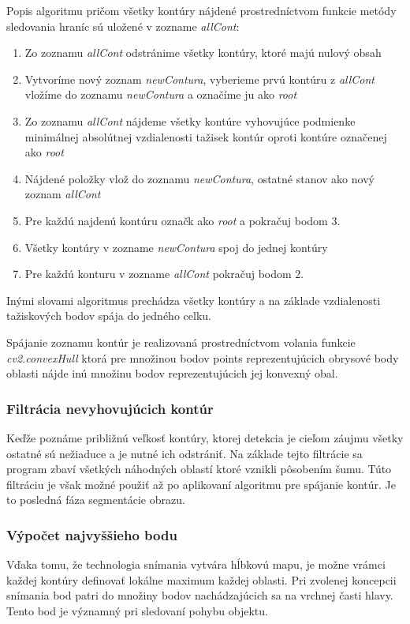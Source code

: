 Popis algoritmu pričom všetky kontúry nájdené prostredníctvom funkcie metódy sledovania hraníc sú uložené v zozname \textit{allCont}:
\begin{enumerate}
  \item Zo zoznamu \textit{allCont} odstránime všetky kontúry, ktoré majú nulový obsah
  \item Vytvoríme nový zoznam \textit{newContura}, vyberieme prvú kontúru z \textit{allCont} vložíme do zoznamu \textit{newContura} a označíme ju ako \textit{root}
  \item Zo zoznamu \textit{allCont} nájdeme všetky kontúre vyhovujúce podmienke minimálnej absolútnej vzdialenosti tažisek kontúr oproti kontúre označenej ako \textit{root}  
  \item Nájdené položky vlož do zoznamu \textit{newContura}, ostatné stanov ako nový zoznam \textit{allCont}
  \item Pre každú najdenú kontúru označk ako \textit{root} a  pokračuj bodom 3.
  \item Všetky kontúry v zozname \textit{newContura} spoj do jednej kontúry
  \item Pre každú konturu v zozname \textit{allCont} pokračuj bodom 2.
  
\end{enumerate}
Inými slovami algoritmus prechádza všetky kontúry a na základe vzdialenosti tažiskových bodov spája do jedného celku.


Spájanie zoznamu kontúr je realizovaná prostredníctvom volania funkcie  \textit{cv2.convexHull} ktorá pre množinou bodov points reprezentujúcich obrysové body oblasti nájde inú množinu bodov reprezentujúcich jej konvexný obal.

\subsubsection{Filtrácia nevyhovujúcich kontúr}  
Keďže poznáme približnú veľkosť kontúry, ktorej detekcia je cieľom záujmu všetky ostatné sú nežiaduce a je nutné ich odstrániť. Na základe tejto filtrácie sa program zbaví všetkých náhodných oblastí ktoré vznikli pôsobením šumu. Túto filtráciu je však možné použiť až po aplikovaní algoritmu pre spájanie kontúr. Je to posledná fáza segmentácie obrazu. 


\subsubsection{Výpočet najvyššieho bodu}
Vďaka tomu, že technologia snímania vytvára hĺbkovú mapu, je možne vrámci každej kontúry definovať lokálne maximum každej oblasti. Pri zvolenej koncepcii snímania bod patri do množiny bodov nachádzajúcich sa na vrchnej časti hlavy. Tento bod je významný pri sledovaní pohybu objektu. \vspace{5mm}


